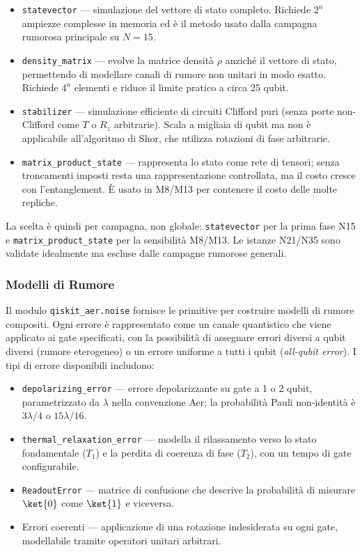 \begin{onehalfspace}
\begin{itemize}
    \item \texttt{statevector} — simulazione del vettore di stato completo. Richiede $2^n$ ampiezze complesse in memoria ed è il metodo usato dalla campagna rumorosa principale su $N=15$.

    \item \texttt{density\_matrix} — evolve la matrice densità $\rho$ anziché il vettore di stato, permettendo di modellare canali di rumore non unitari in modo esatto. Richiede $4^n$ elementi e riduce il limite pratico a circa 25 qubit.

    \item \texttt{stabilizer} — simulazione efficiente di circuiti Clifford puri (senza porte non-Clifford come $T$ o $R_z$ arbitrarie). Scala a migliaia di qubit ma non è applicabile all'algoritmo di Shor, che utilizza rotazioni di fase arbitrarie.

    \item \texttt{matrix\_product\_state} — rappresenta lo stato come rete di tensori; senza troncamenti imposti resta una rappresentazione controllata, ma il costo cresce con l'entanglement. È usato in M8/M13 per contenere il costo delle molte repliche.
\end{itemize}

La scelta è quindi per campagna, non globale: \texttt{statevector} per la prima fase N15 e \texttt{matrix\_product\_state} per la sensibilità M8/M13. Le istanze N21/N35 sono validate idealmente ma escluse dalle campagne rumorose generali.

\subsubsection{Modelli di Rumore}

Il modulo \texttt{qiskit\_aer.noise} fornisce le primitive per costruire modelli di rumore compositi. Ogni errore è rappresentato come un canale quantistico che viene applicato ai gate specificati, con la possibilità di assegnare errori diversi a qubit diversi (rumore eterogeneo) o un errore uniforme a tutti i qubit (\textit{all-qubit error}). I tipi di errore disponibili includono:

\begin{itemize}
    \item \texttt{depolarizing\_error} — errore depolarizzante su gate a 1 o 2 qubit, parametrizzato da $\lambda$ nella convenzione Aer; la probabilità Pauli non-identità è $3\lambda/4$ o $15\lambda/16$.
    \item \texttt{thermal\_relaxation\_error} — modella il rilassamento verso lo stato fondamentale ($T_1$) e la perdita di coerenza di fase ($T_2$), con un tempo di gate configurabile.
    \item \texttt{ReadoutError} — matrice di confusione che descrive la probabilità di misurare $\ket{0}$ come $\ket{1}$ e viceversa.
    \item Errori coerenti — applicazione di una rotazione indesiderata su ogni gate, modellabile tramite operatori unitari arbitrari.
\end{itemize}


\end{onehalfspace}
